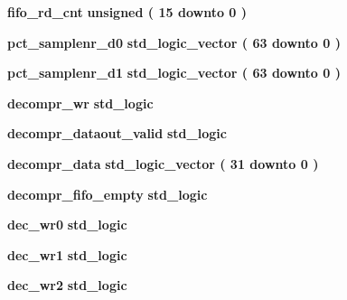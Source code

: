 \begin{DoxyCompactItemize}
\item 
{\bf fifo\+\_\+rd\+\_\+cnt} {\bfseries \textcolor{comment}{unsigned}\textcolor{vhdlchar}{ }\textcolor{vhdlchar}{(}\textcolor{vhdlchar}{ }\textcolor{vhdlchar}{ } \textcolor{vhdldigit}{15} \textcolor{vhdlchar}{ }\textcolor{keywordflow}{downto}\textcolor{vhdlchar}{ }\textcolor{vhdlchar}{ } \textcolor{vhdldigit}{0} \textcolor{vhdlchar}{ }\textcolor{vhdlchar}{)}\textcolor{vhdlchar}{ }} 
\item 
{\bf pct\+\_\+samplenr\+\_\+d0} {\bfseries \textcolor{comment}{std\+\_\+logic\+\_\+vector}\textcolor{vhdlchar}{ }\textcolor{vhdlchar}{(}\textcolor{vhdlchar}{ }\textcolor{vhdlchar}{ } \textcolor{vhdldigit}{63} \textcolor{vhdlchar}{ }\textcolor{keywordflow}{downto}\textcolor{vhdlchar}{ }\textcolor{vhdlchar}{ } \textcolor{vhdldigit}{0} \textcolor{vhdlchar}{ }\textcolor{vhdlchar}{)}\textcolor{vhdlchar}{ }} 
\item 
{\bf pct\+\_\+samplenr\+\_\+d1} {\bfseries \textcolor{comment}{std\+\_\+logic\+\_\+vector}\textcolor{vhdlchar}{ }\textcolor{vhdlchar}{(}\textcolor{vhdlchar}{ }\textcolor{vhdlchar}{ } \textcolor{vhdldigit}{63} \textcolor{vhdlchar}{ }\textcolor{keywordflow}{downto}\textcolor{vhdlchar}{ }\textcolor{vhdlchar}{ } \textcolor{vhdldigit}{0} \textcolor{vhdlchar}{ }\textcolor{vhdlchar}{)}\textcolor{vhdlchar}{ }} 
\item 
{\bf decompr\+\_\+wr} {\bfseries \textcolor{comment}{std\+\_\+logic}\textcolor{vhdlchar}{ }} 
\item 
{\bf decompr\+\_\+dataout\+\_\+valid} {\bfseries \textcolor{comment}{std\+\_\+logic}\textcolor{vhdlchar}{ }} 
\item 
{\bf decompr\+\_\+data} {\bfseries \textcolor{comment}{std\+\_\+logic\+\_\+vector}\textcolor{vhdlchar}{ }\textcolor{vhdlchar}{(}\textcolor{vhdlchar}{ }\textcolor{vhdlchar}{ } \textcolor{vhdldigit}{31} \textcolor{vhdlchar}{ }\textcolor{keywordflow}{downto}\textcolor{vhdlchar}{ }\textcolor{vhdlchar}{ } \textcolor{vhdldigit}{0} \textcolor{vhdlchar}{ }\textcolor{vhdlchar}{)}\textcolor{vhdlchar}{ }} 
\item 
{\bf decompr\+\_\+fifo\+\_\+empty} {\bfseries \textcolor{comment}{std\+\_\+logic}\textcolor{vhdlchar}{ }} 
\item 
{\bf dec\+\_\+wr0} {\bfseries \textcolor{comment}{std\+\_\+logic}\textcolor{vhdlchar}{ }} 
\item 
{\bf dec\+\_\+wr1} {\bfseries \textcolor{comment}{std\+\_\+logic}\textcolor{vhdlchar}{ }} 
\item 
{\bf dec\+\_\+wr2} {\bfseries \textcolor{comment}{std\+\_\+logic}\textcolor{vhdlchar}{ }} 

\end{DoxyCompactItemize}

